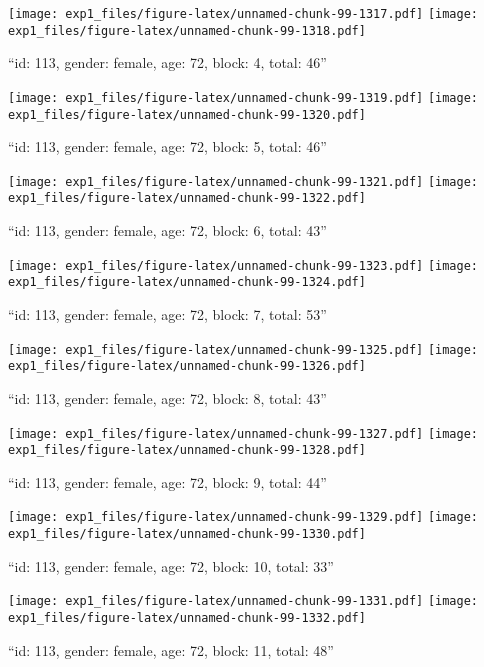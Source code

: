 \documentclass[,]{article}
\begin{document}
\texttt{[image: exp1\_files/figure-latex/unnamed-chunk-99-1317.pdf]}
\texttt{[image: exp1\_files/figure-latex/unnamed-chunk-99-1318.pdf]}

\newpage
[1] 

``id: 113, gender: female, age: 72, block: 4, total: 46''

\texttt{[image: exp1\_files/figure-latex/unnamed-chunk-99-1319.pdf]}
\texttt{[image: exp1\_files/figure-latex/unnamed-chunk-99-1320.pdf]}

\newpage
[1] 

``id: 113, gender: female, age: 72, block: 5, total: 46''

\texttt{[image: exp1\_files/figure-latex/unnamed-chunk-99-1321.pdf]}
\texttt{[image: exp1\_files/figure-latex/unnamed-chunk-99-1322.pdf]}

\newpage
[1] 

``id: 113, gender: female, age: 72, block: 6, total: 43''

\texttt{[image: exp1\_files/figure-latex/unnamed-chunk-99-1323.pdf]}
\texttt{[image: exp1\_files/figure-latex/unnamed-chunk-99-1324.pdf]}

\newpage
[1] 

``id: 113, gender: female, age: 72, block: 7, total: 53''

\texttt{[image: exp1\_files/figure-latex/unnamed-chunk-99-1325.pdf]}
\texttt{[image: exp1\_files/figure-latex/unnamed-chunk-99-1326.pdf]}

\newpage
[1] 

``id: 113, gender: female, age: 72, block: 8, total: 43''

\texttt{[image: exp1\_files/figure-latex/unnamed-chunk-99-1327.pdf]}
\texttt{[image: exp1\_files/figure-latex/unnamed-chunk-99-1328.pdf]}

\newpage
[1] 

``id: 113, gender: female, age: 72, block: 9, total: 44''

\texttt{[image: exp1\_files/figure-latex/unnamed-chunk-99-1329.pdf]}
\texttt{[image: exp1\_files/figure-latex/unnamed-chunk-99-1330.pdf]}

\newpage
[1] 

``id: 113, gender: female, age: 72, block: 10, total: 33''

\texttt{[image: exp1\_files/figure-latex/unnamed-chunk-99-1331.pdf]}
\texttt{[image: exp1\_files/figure-latex/unnamed-chunk-99-1332.pdf]}

\newpage
[1] 

``id: 113, gender: female, age: 72, block: 11, total: 48''
\end{document}
